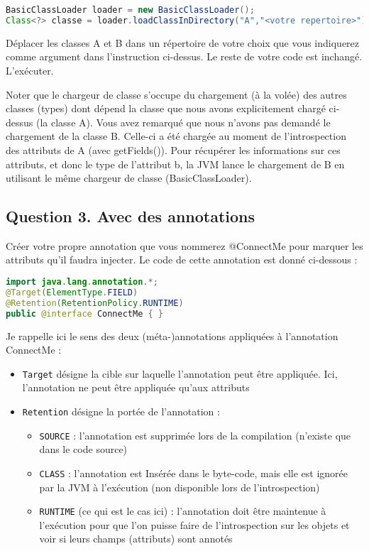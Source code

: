 \documentclass[11pt]{article}
\begin{document}
\begin{lstlisting}[language=Java,basicstyle=\scriptsize]
BasicClassLoader loader = new BasicClassLoader();
Class<?> classe = loader.loadClassInDirectory("A","<votre repertoire>");
\end{lstlisting}

Déplacer les classes A et B dans un répertoire de votre choix que vous
indiquerez comme argument dans l'instruction ci-dessus. Le reste de
votre code est inchangé. L'exécuter.

Noter que le chargeur de classe s'occupe du chargement (à la volée)
des autres classes (types) dont dépend la classe que nous avons
explicitement chargé ci-dessus (la classe A). Vous avez remarqué que
nous n'avons pas demandé le chargement de la classe B. Celle-ci a été
chargée au moment de l'introspection des attributs de A (avec
getFields()). Pour récupérer les informations sur ces attributs, et
donc le type de l'attribut b, la JVM lance le chargement de B en
utilisant le même chargeur de classe (BasicClassLoader).

\subsection*{Question 3. \small{Avec des annotations}}

Créer votre propre annotation que vous nommerez @ConnectMe pour
marquer les attributs qu'il faudra injecter. Le code de cette
annotation est donné ci-dessous :

\begin{lstlisting}[language=Java,basicstyle=\scriptsize]
import java.lang.annotation.*;
@Target(ElementType.FIELD)
@Retention(RetentionPolicy.RUNTIME)
public @interface ConnectMe { }
\end{lstlisting}

Je rappelle ici le sens des deux (méta-)annotations appliquées à l'annotation ConnectMe :
\begin{itemize}
\item \texttt{Target} désigne la cible sur laquelle l'annotation peut
  être appliquée. Ici, l'annotation ne peut être appliquée qu'aux
  attributs
      
\item \texttt{Retention} désigne la portée de l'annotation :
  \begin{itemize}
  \item \texttt{SOURCE} : l'annotation est supprimée lors de la
    compilation (n'existe que dans le code source)
  \item \texttt{CLASS} : l'annotation est Insérée dans le byte-code,
    mais elle est ignorée par la JVM à l'exécution (non disponible
    lors de l'introspection)
  \item \texttt{RUNTIME} (ce qui est le cas ici) : l'annotation doit
    être maintenue à l'exécution pour que l'on puisse faire de
    l’introspection sur les objets et voir si leurs champs (attributs)
    sont annotés
  \end{itemize}
\end{itemize}
          
\end{document}
